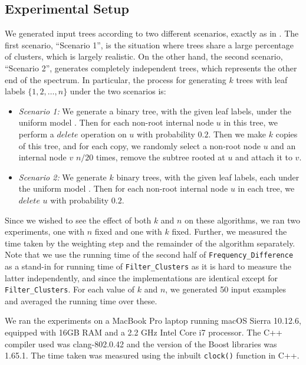 \documentclass{article}
\begin{document}
    \subsection{Experimental Setup}
    \label{subsec:setup}

    We generated input trees according to two different scenarios, exactly as in \cite{jansson2018algorithms}. The first scenario, ``Scenario 1'', is the situation where trees share a large percentage of clusters, which is largely realistic. On the other hand, the second scenario, ``Scenario 2'', generates completely independent trees, which represents the other end of the spectrum. In particular, the process for generating $k$ trees with leaf labels $\{1, 2, \dots, n\}$ under the two scenarios is:

    \begin{itemize}
        \item \textit{Scenario 1:} We generate a binary tree, with the given leaf labels, under the uniform model \cite{mckenzie2000distributions}. Then for each non-root internal node $u$ in this tree, we perform a $delete$ operation on $u$ with probability $0.2$. Then we make $k$ copies of this tree, and for each copy, we randomly select a non-root node $u$ and an internal node $v$ $n / 20$ times, remove the subtree rooted at $u$ and attach it to $v$.

        \item \textit {Scenario 2:} We generate $k$ binary trees, with the given leaf labels, each under the uniform model \cite{mckenzie2000distributions}. Then for each non-root internal node $u$ in each tree, we $delete$ $u$ with probability $0.2$.
    \end{itemize}

    Since we wished to see the effect of both $k$ and $n$ on these algorithms, we ran two experiments, one with $n$ fixed and one with $k$ fixed. Further, we measured the time taken by the weighting step and the remainder of the algorithm separately. Note that we use the running time of the second half of \texttt{Frequency\_Difference} as a stand-in for running time of \texttt{Filter\_Clusters} as it is hard to measure the latter independently, and since the implementations are identical except for \texttt{Filter\_Clusters}. For each value of $k$ and $n$, we generated 50 input examples and averaged the running time over these.

    We ran the experiments on a MacBook Pro laptop running macOS Sierra 10.12.6, equipped with 16GB RAM and a 2.2 GHz Intel Core i7 processor. The C++ compiler used was clang-802.0.42 and the version of the Boost libraries was 1.65.1. The time taken was measured using the inbuilt \texttt{clock()} function in C++.
\end{document}
